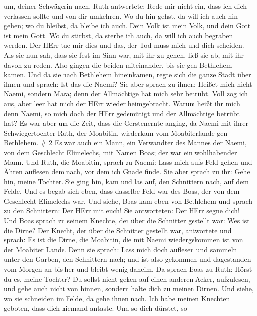 um, deiner Schwägerin nach.  Ruth antwortete: Rede mir
nicht ein, dass ich dich verlassen sollte und von dir umkehren. Wo du
hin gehst, da will ich auch hin gehen; wo du bleibst, da bleibe ich
auch. Dein Volk ist mein Volk, und dein Gott ist mein Gott.
 Wo du stirbst, da sterbe ich auch, da will ich auch
begraben werden. Der HErr tue mir dies und das, der Tod muss mich und
dich scheiden.  Als sie nun sah, dass sie fest im Sinn war,
mit ihr zu gehen, ließ sie ab, mit ihr davon zu reden. 
Also gingen die beiden miteinander, bis sie gen Bethlehem kamen. Und da
sie nach Bethlehem hineinkamen, regte sich die ganze Stadt über ihnen
und sprach: Ist das die Naemi?  Sie aber sprach zu ihnen:
Heißet mich nicht Naemi, sondern Mara; denn der Allmächtige hat mich
sehr betrübt.  Voll zog ich aus, aber leer hat mich der
HErr wieder heimgebracht. Warum heißt ihr mich denn Naemi, so mich doch
der HErr gedemütigt und der Allmächtige betrübt hat?  Es
war aber um die Zeit, dass die Gerstenernte anging, da Naemi mit ihrer
Schwiegertochter Ruth, der Moabitin, wiederkam vom Moabiterlande gen
Bethlehem. \# 2  Es war auch ein Mann, ein Verwandter des
Mannes der Naemi, von dem Geschlecht Elimelechs, mit Namen Boas; der war
ein wohlhabender Mann.  Und Ruth, die Moabitin, sprach zu
Naemi: Lass mich aufs Feld gehen und Ähren auflesen dem nach, vor dem
ich Gnade finde. Sie aber sprach zu ihr: Gehe hin, meine Tochter.
 Sie ging hin, kam und las auf, den Schnittern nach, auf dem
Felde. Und es begab sich eben, dass dasselbe Feld war des Boas, der von
dem Geschlecht Elimelechs war.  Und siehe, Boas kam eben von
Bethlehem und sprach zu den Schnittern: Der HErr mit euch! Sie
antworteten: Der HErr segne dich!  Und Boas sprach zu seinem
Knechte, der über die Schnitter gestellt war: Wes ist die Dirne?
 Der Knecht, der über die Schnitter gestellt war, antwortete
und sprach: Es ist die Dirne, die Moabitin, die mit Naemi wiedergekommen
ist von der Moabiter Lande.  Denn sie sprach: Lass mich doch
auflesen und sammeln unter den Garben, den Schnittern nach; und ist also
gekommen und dagestanden vom Morgen an bis her und bleibt wenig daheim.
 Da sprach Boas zu Ruth: Hörst du es, meine Tochter? Du
sollst nicht gehen auf einen anderen Acker, aufzulesen, und gehe auch
nicht von hinnen, sondern halte dich zu meinen Dirnen.  Und
siehe, wo sie schneiden im Felde, da gehe ihnen nach. Ich habe meinen
Knechten geboten, dass dich niemand antaste. Und so dich dürstet, so
